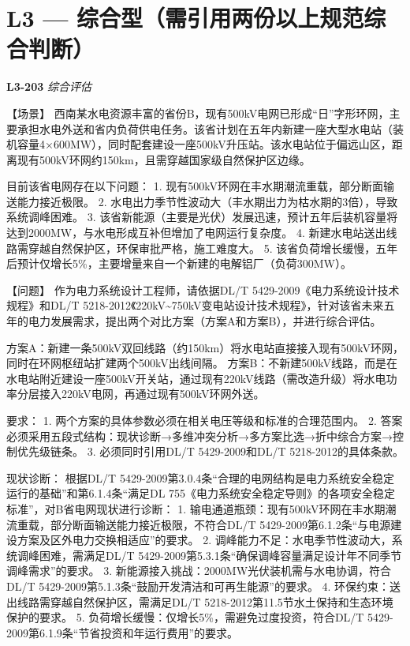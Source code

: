 \documentclass[12pt,a4paper]{ctexart}
\begin{document}
\section*{L3 — 综合型（需引用两份以上规范综合判断）}

\noindent\textbf{L3-203} \hfill \textit{综合评估}
\begin{description}[leftmargin=1.5em,style=nextline,font=\normalfont]
  \item[Q:] 【场景】
西南某水电资源丰富的省份B，现有500kV电网已形成“日”字形环网，主要承担水电外送和省内负荷供电任务。该省计划在五年内新建一座大型水电站（装机容量4×600MW），同时配套建设一座500kV升压站。该水电站位于偏远山区，距离现有500kV环网约150km，且需穿越国家级自然保护区边缘。

目前该省电网存在以下问题：
1. 现有500kV环网在丰水期潮流重载，部分断面输送能力接近极限。
2. 水电出力季节性波动大（丰水期出力为枯水期的3倍），导致系统调峰困难。
3. 该省新能源（主要是光伏）发展迅速，预计五年后装机容量将达到2000MW，与水电形成互补但增加了电网运行复杂度。
4. 新建水电站送出线路需穿越自然保护区，环保审批严格，施工难度大。
5. 该省负荷增长缓慢，五年后预计仅增长5\%，主要增量来自一个新建的电解铝厂（负荷300MW）。

【问题】
作为电力系统设计工程师，请依据DL/T 5429-2009《电力系统设计技术规程》和DL/T 5218-2012《220kV\textasciitilde{}750kV变电站设计技术规程》，针对该省未来五年的电力发展需求，提出两个对比方案（方案A和方案B），并进行综合评估。

方案A：新建一条500kV双回线路（约150km）将水电站直接接入现有500kV环网，同时在环网枢纽站扩建两个500kV出线间隔。
方案B：不新建500kV线路，而是在水电站附近建设一座500kV开关站，通过现有220kV线路（需改造升级）将水电功率分层接入220kV电网，再通过现有500kV环网外送。

要求：
1. 两个方案的具体参数必须在相关电压等级和标准的合理范围内。
2. 答案必须采用五段式结构：现状诊断→多维冲突分析→多方案比选→折中综合方案→控制优先级链条。
3. 必须同时引用DL/T 5429-2009和DL/T 5218-2012的具体条款。
  \item[A:] 现状诊断：
根据DL/T 5429-2009第3.0.4条“合理的电网结构是电力系统安全稳定运行的基础”和第6.1.4条“满足DL 755《电力系统安全稳定导则》的各项安全稳定标准”，对B省电网现状进行诊断：
1. 输电通道瓶颈：现有500kV环网在丰水期潮流重载，部分断面输送能力接近极限，不符合DL/T 5429-2009第6.1.2条“与电源建设方案及区外电力交换相适应”的要求。
2. 调峰能力不足：水电季节性波动大，系统调峰困难，需满足DL/T 5429-2009第5.3.1条“确保调峰容量满足设计年不同季节调峰需求”的要求。
3. 新能源接入挑战：2000MW光伏装机需与水电协调，符合DL/T 5429-2009第5.1.3条“鼓励开发清洁和可再生能源”的要求。
4. 环保约束：送出线路需穿越自然保护区，需满足DL/T 5218-2012第11.5节水土保持和生态环境保护的要求。
5. 负荷增长缓慢：仅增长5\%，需避免过度投资，符合DL/T 5429-2009第6.1.9条“节省投资和年运行费用”的要求。


\end{description}
\end{document}

